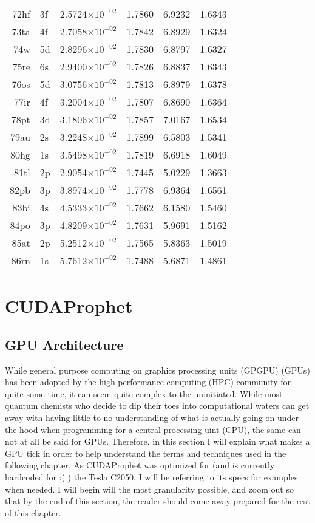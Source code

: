 \documentclass[12pt]{book}
\begin{document}
\begin{center}
\begin{longtable}{r l l l l l l l l l}
	72hf	&	3f	&	2.5724$\times10^{-02}$	&	1.7860	&	6.9232	&	1.6343 \\
	73ta	&	4f	&	2.7058$\times10^{-02}$	&	1.7842	&	6.8929	&	1.6324 \\
	74w	  &	5d	&	2.8296$\times10^{-02}$	&	1.7830	&	6.8797	&	1.6327 \\
	75re	&	6s	&	2.9400$\times10^{-02}$	&	1.7826	&	6.8837	&	1.6343 \\
	76os	&	5d	&	3.0756$\times10^{-02}$	&	1.7813	&	6.8979	&	1.6378 \\
	77ir	&	4f	&	3.2004$\times10^{-02}$	&	1.7807	&	6.8690	&	1.6364 \\
	78pt	&	3d	&	3.1806$\times10^{-02}$	&	1.7857	&	7.0167	&	1.6534 \\
	79au	&	2s	&	3.2248$\times10^{-02}$	&	1.7899	&	6.5803	&	1.5341 \\
	80hg	&	1s	&	3.5498$\times10^{-02}$	&	1.7819	&	6.6918	&	1.6049 \\
	81tl	&	2p	&	2.9054$\times10^{-02}$	&	1.7445	&	5.0229	&	1.3663 \\
	82pb	&	3p	&	3.8974$\times10^{-02}$	&	1.7778	&	6.9364	&	1.6561 \\
	83bi	&	4s	&	4.5333$\times10^{-02}$	&	1.7662	&	6.1580	&	1.5460 \\
	84po	&	3p	&	4.8209$\times10^{-02}$	&	1.7631	&	5.9691	&	1.5162 \\
	85at	&	2p	&	5.2512$\times10^{-02}$	&	1.7565	&	5.8363	&	1.5019 \\
	86rn	&	1s	&	5.7612$\times10^{-02}$	&	1.7488	&	5.6871	&	1.4861 \\
\end{longtable}
\end{center}
	
\chapter{CUDAProphet}
\section{GPU Architecture}
While general purpose computing on graphics processing units (GPGPU) (GPUs) has been adopted by the high performance computing (HPC) community for quite some time, it can seem quite complex to the uninitiated. While most quantum chemists who decide to dip their toes into computational waters can get away with having little to no understanding of what is actually going on under the hood when programming for a central processing uint (CPU), the same can not at all be said for GPUs. Therefore, in this section I will explain what makes a GPU tick in order to help understand the terms and techniques used in the following chapter. As CUDAProphet was optimized for (and is currently hardcoded for :( ) the Tesla C2050, I will be referring to its specs for examples when needed. I will begin will the most granularity possible, and zoom out so that by the end of this section, the reader should come away prepared for the rest of this chapter.
\end{document}

